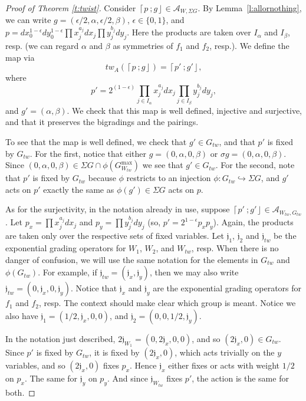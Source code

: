 \documentclass[10pt, letterpaper]{amsart}
\theoremstyle{remark}
\newcommand{\sA}{\mathscr{A}}
\newcommand{\fjrw}[2]{ \left\lceil #1 \:; #2 \right\rfloor }
\newcommand{\jw}{\mathfrak{j}}
\newcommand{\set}[1]{\{#1\}}
\newcommand{\tw}[1]{{#1}_{tw}}
\newcommand{\s}[1]{\Sigma #1}
\begin{document}
\begin{proof}[Proof of Theorem \ref{t:twist}] 
Consider $\fjrw{p}{g}\in \sA_{W,\s{G}}$. By Lemma~\ref{l:allornothing}, we can write $g=(\epsilon/2, \alpha, \epsilon/2, \beta)$, $\epsilon\in \set{0,1}$, and $p=dx_0^{1-\epsilon} dy_0^{1-\epsilon}\prod x_j^{a_j}dx_j \prod y_j^{b_j}dy_j$. Here the products are taken over $I_\alpha$ and $I_\beta$, resp. (we can regard $\alpha$ and $\beta$ as symmetries of $f_1$ and $f_2$, resp.). We define the map via
\[
tw_A(\fjrw{p}{g})=\fjrw{p'}{g'}, 
\]
where 
\[
p'=2^{(1-\epsilon)}\prod_{j\in I_\alpha} x_j^{a_j}dx_j \prod_{j\in I_\beta} y_j^{b_j}dy_j,
\] 
and $g'=(\alpha,\beta)$. We check that this map is well defined, injective and surjective, and that it preserves the bigradings and the pairings. 

To see that the map is well defined, we check that $g'\in \tw{G}$, and that $p'$ is fixed by $\tw{G}$. For the first, notice that either $g=(0,\alpha,0,\beta)$ or $\sigma g=(0,\alpha,0,\beta)$. Since $(0,\alpha,0,\beta)\in \s{G}\cap \phi (G^{\max}_{\tw{W}})$ we see that $g'\in \tw{G}$. For the second, note that $p'$ is fixed by $\tw{G}$ because $\phi$ restricts to an injection $\phi:\tw{G}\hookrightarrow \s{G}$, and $g'$ acts on $p'$ exactly the same as $\phi(g')\in \s{G}$ acts on $p$. 

As for the surjectivity, in the notation already in use, suppose $\fjrw{p'}{g'}\in \sA_{\tw{W},\tw{G}}$. Let $p_x=\prod x_j^{a_j}dx_j$ and $p_y=\prod y_j^{b_j}dy_j$ (so, $p'= 2^{1-\epsilon}p_xp_y$). Again, the products are taken only over the respective sets of fixed variables. Let $\jw_{1}$, $\jw_{2}$ and $\tw{\jw}$ be the exponential grading operators for $W_1$, $W_2$, and $\tw{W}$, resp. When there is no danger of confusion, we will use the same notation for the elements in $\tw{G}$ and $\phi(\tw{G})$. For example, if $\tw{\jw}=(\jw_x,\jw_y)$, then we may also write $\tw{\jw}=(0,\jw_x,0,\jw_y)$. Notice that $\jw_x$ and $\jw_y$ are the exponential grading operators for $f_1$ and $f_2$, resp. The context should make clear which group is meant. Notice we also have $\jw_{1}=(1/2,\jw_x,0,0)$, and $\jw_{2}=(0,0,1/2,\jw_y)$.  

In the notation just described, $2\jw_{W_1}=(0,2\jw_x,0,0)$, and so $(2\jw_x,0)\in \tw{G}$. Since $p'$ is fixed by $\tw{G}$, it is fixed by $(2\jw_x,0)$, which acts trivially on the $y$ variables, and so $(2\jw_x,0)$ fixes $p_x$. %
Hence $\jw_x$ either fixes or acts with weight $1/2$ on $p_x$. The same for $\jw_y$ on $p_y$. And since $\jw_{\tw{W}}$ fixes $p'$, the action is the same for both. 


\end{proof}
\end{document}
